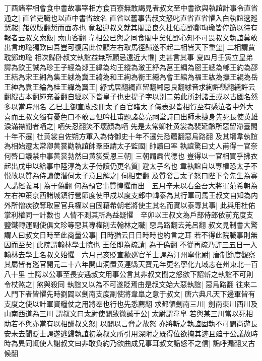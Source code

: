 丁酉諸宰相會食中書故事宰相方食百寮無敢謁見者叔文至中書欲與執誼計事令直省通之|{
	直省吏職也以直中書省故名}
直省以舊事告叔文怒叱直省直省懼入白執誼逡廵慙赧|{
	赧奴版翻慙而面赤也}
竟起迎叔文就其閤語良久杜佑高郢鄭珣瑜皆停筯以待有報者云叔文索飯|{
	索山客翻}
韋相公已與之同食閤中矣佑郢心知不可畏叔文執誼莫敢出言珣瑜獨歎曰吾豈可復居此位顧左右取馬徑歸遂不起二相皆天下重望|{
	二相謂賈耽鄭珣瑜}
相次歸卧叔文執誼益無所顧忌遠近大懼|{
	史甚言其事}
夏四月壬寅立皇弟諤為欽王誠為珍王子經為郯王緯為均王縱為漵王紓為莒王綢為密王總為郇王約為邵王結為宋王緗為集王絿為冀王綺為和王絢為衡王纁為會王綰為福王紘為撫王緄為岳王紳為袁王綸為桂王繟為翼王|{
	紓式居翻綢直留翻緗思良翻絿音求絢許縣翻纁許云翻緄古本翻繟充善翻自經以下皆皇子也史提子字以别二弟此所封諸王或以古國名然多以當時州名}
乙巳上御宣政殿冊太子百官睹太子儀表退皆相賀至有感泣者中外大喜而王叔文獨有憂色口不敢言但吟杜甫題諸葛亮祠堂詩曰出師未捷身先死長使英雄淚滿襟聞者哂之|{
	哂矢忍翻笑不壞顔為哂}
先是太常卿杜黄裳為裴延齡所惡留滯臺閣十年不遷|{
	杜黄裳自佐朔方軍入為侍御史十年不遷先悉薦翻惡烏路翻}
及其壻韋執誼為相始遷太常卿黄裳勸執誼帥羣臣請太子監國|{
	帥讀曰率}
執誼驚曰丈人甫得一官奈何啓口議禁中事黄裳勃然曰黄裳受恩三朝|{
	三朝謂肅代德也}
豈得以一官相買乎拂衣起出戊申以給事中陸淳為太子侍讀仍更名質|{
	避太子名也}
韋執誼自以專權恐太子不悦故以質為侍讀使潛伺太子意且解之|{
	伺相吏翻}
及質發言太子怒曰陛下令先生為寡人講經義耳|{
	為于偽翻}
何為預它事質惶懼而出　五月辛未以右金吾大將軍范希朝為左右神策京西諸城鎮行營節度使甲戍以度支郎中韓泰為其行軍司馬王叔文自知為内外所憎疾欲奪取宦官兵權以自固藉希朝老將使主其名而實以泰專其事|{
	此與用杜佑掌利權同一計數也}
人情不測其所為益疑懼　辛卯以王叔文為戶部侍郎依前充度支鹽鐵轉運副使俱文珍等惡其專權削去翰林之職|{
	惡烏路翻去羌呂翻}
叔文見制書大驚謂人曰叔文日時至此商量公事|{
	日時猶云日日時時也約言之耳}
若不得此院職事則無因而至矣|{
	此院謂翰林學士院也}
王伾即為疏請|{
	為于偽翻}
不從再疏乃許三五日一入翰林去學士名叔文始懼　六月己亥貶宣歙廵官羊士諤為汀州寧化尉|{
	唐制節度觀察其屬皆有廵官開元二十六年開山洞置黄連縣天寶元年更名寧化九域志在州東北一百八十里}
士諤以公事至長安遇叔文用事公言其非叔文聞之怒欲下詔斬之執誼不可則令杖煞之|{
	煞與殺同}
執誼又以為不可遂貶焉由是叔文始大惡執誼|{
	惡烏路翻}
往來二人門下者皆懼先時劉闢以劍南支度副使將韋臯之意于叔文|{
	唐六典凡天下邊軍皆有支度之使以計軍資糧仗之用將奉也行也先悉薦翻}
求都領劍南三川|{
	劍南東川西川及山南西道為三川}
謂叔文曰太尉使闢致微誠于公|{
	太尉謂韋臯}
若與某三川當以死相助若不與亦當有以相酬叔文怒|{
	以闢以言脅之故怒}
亦將斬之執誼固執不可闢尚遊長安未去聞貶士諤遂逃歸執誼初為叔文所引用深附之既得位欲掩其迹且廹于公議故時時為異同輒使人謝叔文曰非敢負約乃欲曲成兄事耳叔文詬怒不之信|{
	詬呼漏翻又古候翻}
